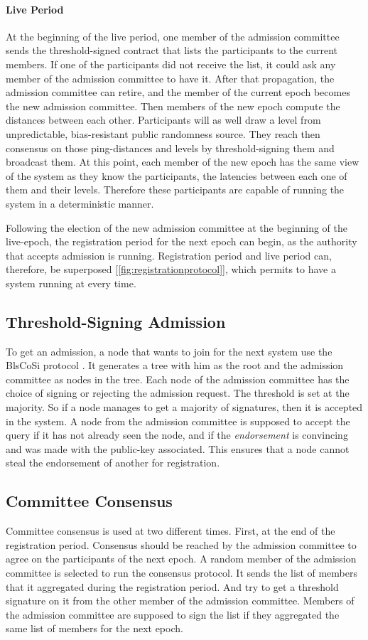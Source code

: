 \documentclass[a4paper,11pt,oneside]{report}
\begin{document}
\paragraph{Live Period}
At the beginning of the live period, one member of the admission committee sends the threshold-signed contract that lists the participants to the current
members. If one of the participants did not receive the list, it could ask any
member of the admission committee to have it. After that propagation, the
admission committee can retire, and the member of the current epoch becomes the
new admission committee. Then members of the new epoch compute the
distances between each other. Participants will as well draw a level from
unpredictable, bias-resistant public randomness source. They reach then
consensus on those ping-distances and levels by threshold-signing them and
broadcast them. At this point, each member of the new epoch has the same
view of the system as they know the participants, the latencies between
each one of them and their levels. Therefore these participants are capable
of running the system in a deterministic manner.

Following the election of the new admission committee at the beginning of the
live-epoch, the registration period for the next epoch can begin, as the
authority that accepts admission is running. Registration period and live
period can, therefore, be superposed [\autoref{fig:registrationprotocol}], which
permits to have a system running at every time. 

\subsection{Threshold-Signing Admission}
To get an admission, a node that wants to join for the next system use the
BlsCoSi protocol \cite{Boneh2018}. It generates a tree with him as
the root and the admission committee as nodes in the tree. Each node of the
admission committee has the choice of signing or rejecting the admission
request. The threshold is set at the majority. So if a node manages to get a
majority of signatures, then it is accepted in the system. A node from the
admission committee is supposed to accept the query if it has not already seen
the node, and if the \textit{endorsement} is convincing and was made with the public-key
associated. This ensures that a node cannot steal the endorsement of another
for registration.  

\subsection{Committee Consensus}
Committee consensus is used at two different times. First, at the end of the
registration period. Consensus should be reached by the admission committee to agree on
the participants of the next epoch. A random member of the admission committee
is selected to run the consensus protocol. It sends the list of members
that it aggregated during the registration period. And try to get a threshold
signature on it from the other member of the admission committee. Members of
the admission committee are supposed to sign the list if they aggregated the
same list of members for the next epoch.
\end{document}
